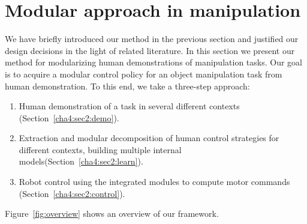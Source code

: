 \section{Modular approach in manipulation}
\label{cha4:sec2}


We have briefly introduced our method in the previous section and
justified our design decisions in the light of related literature.  In
this section we present our method for modularizing human
demonstrations of manipulation tasks. Our goal is to acquire a modular
control policy for an object manipulation task from human
demonstration. To this end, we take a three-step approach:
\begin{enumerate}
\item Human demonstration of a task in several different contexts  (Section~\ref{cha4:sec2:demo}).
\item Extraction and modular decomposition of human control strategies
  for different contexts, building multiple internal models(Section~\ref{cha4:sec2:learn}).
\item Robot control using the integrated modules to compute motor
  commands (Section~\ref{cha4:sec2:control}).
\end{enumerate}

Figure~\ref{fig:overview} shows an overview of our framework.

